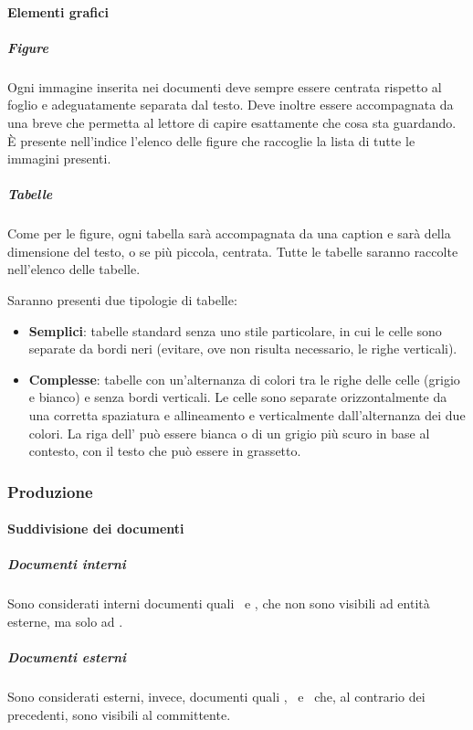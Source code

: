 			\paragraph{Elementi grafici}

			\subparagraph{Figure}
			Ogni immagine inserita nei documenti deve sempre essere centrata rispetto al foglio e adeguatamente separata dal testo. Deve inoltre essere
			accompagnata da una breve  che permetta al lettore di capire esattamente che cosa sta guardando.\\
			È presente nell'indice l'elenco delle figure che raccoglie la lista di tutte le immagini presenti.

			\subparagraph{Tabelle}
			Come per le figure, ogni tabella sarà accompagnata da una caption e sarà della dimensione del testo, o se più piccola, centrata.
			Tutte le tabelle saranno raccolte nell'elenco delle tabelle.\par
			Saranno presenti due tipologie di tabelle:
			\begin{itemize}
				\item \textbf{Semplici}: tabelle standard senza uno stile particolare, in cui le celle sono separate da bordi neri (evitare, ove non risulta necessario,
					le righe verticali).
				\item \textbf{Complesse}: tabelle con un'alternanza di colori tra le righe delle celle (grigio e bianco) e senza bordi verticali.
					Le celle sono separate orizzontalmente da una corretta spaziatura e allineamento e verticalmente dall'alternanza dei due colori.
					La riga dell' può essere bianca o di un grigio più scuro in base al contesto, con il testo che può essere in grassetto.
			\end{itemize}


		\subsubsection{Produzione}

			\paragraph{Suddivisione dei documenti}

			\subparagraph{Documenti interni}
			Sono considerati interni documenti quali \SdF\ e \NdP, che non sono visibili ad entità esterne, ma solo ad \gruppo.

			\subparagraph{Documenti esterni}
			Sono considerati esterni, invece, documenti quali \PdP, \PdQ\ e \AdR\ che, al contrario dei precedenti, sono visibili al committente.

